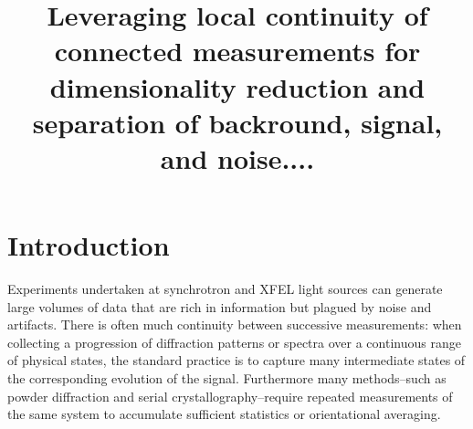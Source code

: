 \documentclass[12pt]{iopart}
\begin{document}
\title[]{Leveraging local continuity of connected measurements for dimensionality reduction and separation of backround, signal, and noise.... }

\author{}


%
%

%
%
%
% 
%



\section{Introduction}
Experiments undertaken at synchrotron and XFEL light sources can generate large volumes of data that are rich in information but plagued by noise and artifacts. There is often much continuity between successive measurements: when collecting a progression of diffraction patterns or spectra over a continuous range of physical states, the standard practice is to capture many intermediate states of the corresponding evolution of the signal. Furthermore many methods--such as powder diffraction and serial crystallography--require repeated measurements of the same system to accumulate sufficient statistics or orientational averaging. 
\end{document}
